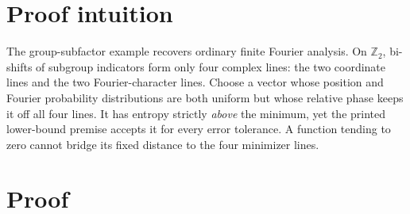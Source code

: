 \documentclass[11pt]{article}
\begin{document}
\section{Proof intuition}

The group-subfactor example recovers ordinary finite Fourier analysis.  On
$\mathbb Z_2$, bi-shifts of subgroup indicators form only four complex
lines: the two coordinate lines and the two Fourier-character lines.  Choose
a vector whose position and Fourier probability distributions are both
uniform but whose relative phase keeps it off all four lines.  It has entropy
strictly \emph{above} the minimum, yet the printed lower-bound premise accepts
it for every error tolerance.  A function tending to zero cannot bridge its
fixed distance to the four minimizer lines.

\section{Proof}
\end{document}
